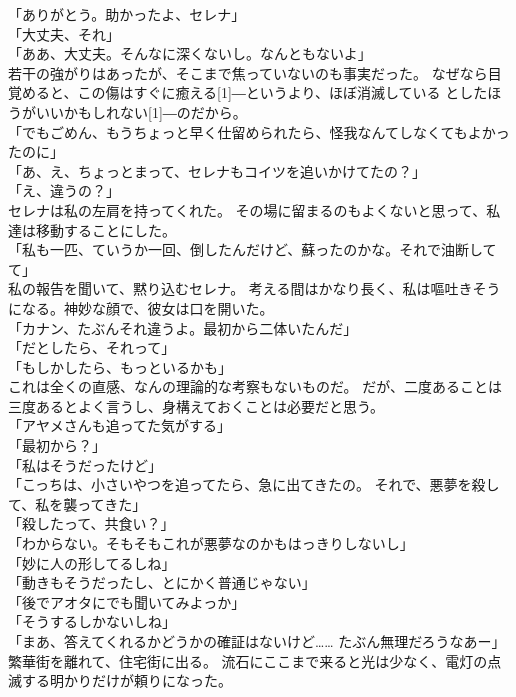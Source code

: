\documentclass[../IHMain]{subfiles}
\begin{document}
「ありがとう。助かったよ、セレナ」\\
「大丈夫、それ」\\
「ああ、大丈夫。そんなに深くないし。なんともないよ」\\
若干の強がりはあったが、そこまで焦っていないのも事実だった。
なぜなら目覚めると、この傷はすぐに癒える\scalebox{3}[1]{―}というより、ほぼ消滅している
としたほうがいいかもしれない\scalebox{3}[1]{―}のだから。\\
「でもごめん、もうちょっと早く仕留められたら、怪我なんてしなくてもよかったのに」\\
「あ、え、ちょっとまって、セレナもコイツを追いかけてたの？」\\
「え、違うの？」\\
セレナは私の左肩を持ってくれた。
その場に留まるのもよくないと思って、私達は移動することにした。\\
「私も一匹、ていうか一回、倒したんだけど、蘇ったのかな。それで油断してて」\\
私の報告を聞いて、黙り込むセレナ。
考える間はかなり長く、私は嘔吐きそうになる。神妙な顔で、彼女は口を開いた。\\
「カナン、たぶんそれ違うよ。最初から二体いたんだ」\\
「だとしたら、それって」\\
「もしかしたら、もっといるかも」\\
これは全くの直感、なんの理論的な考察もないものだ。
だが、二度あることは三度あるとよく言うし、身構えておくことは必要だと思う。\\
「アヤメさんも追ってた気がする」\\
「最初から？」\\
「私はそうだったけど」\\
「こっちは、小さいやつを追ってたら、急に出てきたの。
それで、悪夢を殺して、私を襲ってきた」\\
「殺したって、共食い？」\\
「わからない。そもそもこれが悪夢なのかもはっきりしないし」\\
「妙に人の形してるしね」\\
「動きもそうだったし、とにかく普通じゃない」\\
「後でアオタにでも聞いてみよっか」\\
「そうするしかないしね」\\
「まあ、答えてくれるかどうかの確証はないけど……
たぶん無理だろうなあー」\\
繁華街を離れて、住宅街に出る。
流石にここまで来ると光は少なく、電灯の点滅する明かりだけが頼りになった。
\end{document}
